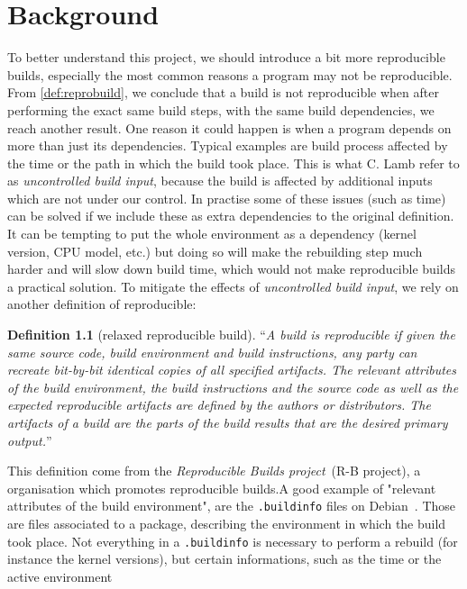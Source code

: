 \documentclass[a4paper,11pt,oneside]{report}
\theoremstyle{definition}
\newtheorem{definition}{Definition}[section]
\newcommand{\rb}{reproducible builds\xspace}
\begin{document}
\chapter{Background}
\label{chap:bg}

To better understand this project, we should introduce a bit more \rb,
especially the most common reasons a program may not be reproducible. From
\autoref{def:reprobuild}, we conclude that a build is not reproducible when
after performing the exact same build steps, with the same build dependencies,
we reach another result. One reason it could happen is when a program
depends on more than just its dependencies. Typical examples are build process
affected by the time or the path in which the build took place. This is what C.
Lamb refer to as \emph{uncontrolled build input}, because the build is
affected by additional inputs which are not under our control.
In practise some of these issues (such as time) can be solved if we
include these as extra dependencies to the original definition. It can be tempting
to put the whole environment as a dependency (kernel version, CPU model, etc.) but
doing so will make the rebuilding step much harder and will slow down build time,
which would not make \rb a practical solution.
To mitigate the effects of \emph{uncontrolled build input}, we rely on another
definition of reproducible:
\begin{definition}[relaxed reproducible build]
\label{def:reprobuild2}
``\emph{A build is reproducible if given the same source code, build
    environment and build instructions, any party can recreate bit-by-bit
    identical copies of all specified artifacts.
The relevant attributes of the build environment, the build instructions and
    the source code as well as the expected reproducible artifacts are defined
    by the authors or distributors. The artifacts of a build are the parts of
    the build results that are the desired primary output.}''~\cite{reprobuilds:def}
\end{definition}
This definition come from the \emph{Reproducible Builds project}~(R-B
project), a organisation which promotes \rb.A good example of "relevant
attributes of the build environment", are the \verb|.buildinfo| files on
Debian~\cite{debian:buildinfo}. Those are files associated to a package,
describing the environment in which the build took place. Not everything in a
\verb|.buildinfo| is necessary to perform a rebuild (for instance the kernel
versions), but certain informations, such as the time or the active environment
\end{document}

